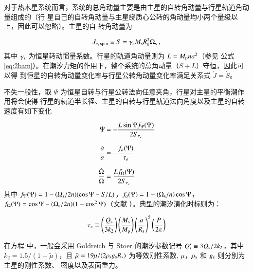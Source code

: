对于热木星系统而言，系统的总角动量主要是由主星的自转角动量与行星轨道角动量组成的（行
星自己的自转角动量与主星绕质心公转的角动量均小两个量级以上，因此可以忽略）。主星的自
转角动量为

\begin{equation} \label{eq:spinam}
J_{*,\,\mathrm{spin}} \equiv S = \gamma_\mathrm{s} M_\mathrm{s} R_\mathrm{s}^2 \Omega_\mathrm{s} \ ,
\end{equation} %
其中 $\gamma_\mathrm{s}$ 为恒星转动惯量系数。行星的轨道角动量则为 $L = M_\mathrm{p}na^2$（参见
公式 \ref{eq:2bam}）。在潮汐力矩的作用下，整个系统的总角动量（$S+L$）守恒，因此可以得
到恒星的自转角动量变化率与行星公转角动量变化率满足关系式 $\dot{J} = \dot{S}$。

不失一般性，取 $\Psi$ 为恒星自转与行星公转法向任意夹角，行星对主星的平衡潮作用将会使得
行星的轨道半长径、主星的自转与行星轨道法向角度以及主星的自转速度有如下变化

\begin{subequations} \label{eq:tidalevo}
\setlength{\jot}{10pt}
\begin{align}
   \dot{\Psi} &= - \frac{L\sin \Psi f_\Psi(\Psi)}{2S_{\tau_e}}     \label{eq:obevo} \\
    \frac{\dot{a}}{a} &= - \frac{f_a(\Psi)}{\tau_e}   \label{eq:smaevo}  \\
    \frac{\dot{\Omega}}{\Omega} & = \frac{Lf_\Omega(\Psi)}{2S_{\tau_e}} \label{eq:spinevo}
\end{align}
\end{subequations} %
其中 $f_\Psi(\Psi) = 1 - (\Omega_\mathrm{s}/2n)(\cos\Psi - S/L)$，$f_a(\Psi) = 1 - (\Omega_\mathrm{s}/n)\cos\Psi$，
$f_\Omega(\Psi) = \cos\Psi - (\Omega_\mathrm{s}/2n)(1+ \cos^2\Psi)$（文献 ）。典型的潮汐演化时标则为：

\begin{equation} \label{eq:taue}
\tau_e \equiv \left( {Q_\mathrm{s} \over 3 k_2} \right) \left( {M_\mathrm{s} \over M_\mathrm{p}}\right)
\left( {a \over R_\mathrm{s}}\right)^5 \left( {P \over 2 \pi} \right) 
\end{equation} %

在方程 \label{eq:taue} 中，一般会采用 Goldreich 与 Stoer 的潮汐参数记号 $Q_\mathrm{s}^\prime \equiv 3 
Q_\mathrm{s}/2k_2$，其中 $k_2 =1.5/(1+{\tilde \mu})$，且 ${\tilde \mu} = 19 \mu/(2 \rho_\mathrm{s} 
g_\mathrm{s} R_\mathrm{s})$ 为等效刚性系数, $\mu$，$\rho_\mathrm{s}$ 和 $g_\mathrm{s}$ 则分别为主星的刚性系数、
密度以及表面重力。

